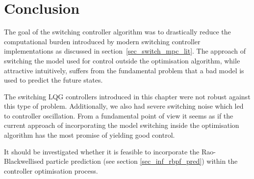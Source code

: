 \section{Conclusion}
The goal of the switching controller algorithm was to drastically reduce the computational burden introduced by modern switching controller implementations as discussed in section~\ref{sec_switch_mpc_lit}. The approach of switching the model used for control outside the optimisation algorithm, while attractive intuitively, suffers from the fundamental problem that a bad model is used to predict the future states.

The switching LQG controllers introduced in this chapter were not robust against this type of problem. Additionally, we also had severe switching noise which led to controller oscillation. From a fundamental point of view it seems as if the current approach of incorporating the model switching inside the optimisation algorithm has the most promise of yielding good control. 

It should be investigated whether it is feasible to incorporate the Rao-Blackwellised particle prediction (see section \ref{sec_inf_rbpf_pred}) within the controller optimisation process.  